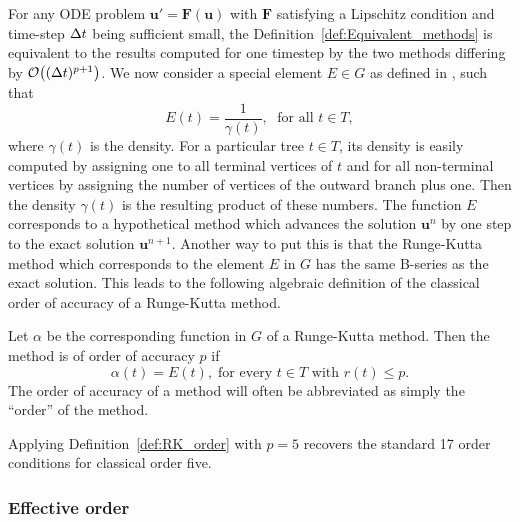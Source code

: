 \indent For any ODE problem $\bm{u}'= \bm{F}(\bm{u})$ with $\bm{F}$ satisfying a Lipschitz condition and time-step $\Delta t$ being sufficient small, the Definition~\ref{def:Equivalent_methods} is equivalent to the results computed for one timestep by the two methods differing by $\mathcal{O}\bigl((\Delta t)^{p+1}\bigr)$.
We now consider a special element $E \in G$ as defined in \cite{Butcher1987_book}, such that
\begin{displaymath}
 	E(t) = \frac{1}{\gamma(t)}, \; \text{ for all } t \in T,
\end{displaymath}
where $\gamma(t)$ is the density. For a particular tree $t \in T$, its density is easily computed by assigning one to all terminal vertices of $t$ and for all non-terminal vertices by assigning the number of vertices of the outward branch plus one. Then the density $\gamma(t)$ is the resulting product of these numbers. The function $E$ corresponds to a hypothetical method which advances the solution $\bm{u}^n$ by one step to the exact solution $\bm{u}^{n+1}$.  Another way to put this is that the Runge-Kutta method which corresponds to the element $E$ in $G$ has the same B-series as the exact solution. This leads to the following algebraic definition of the classical order of accuracy of a Runge-Kutta method.
\begin{definition}\label{def:RK_order}
	Let $\alpha$ be the corresponding function in $G$ of a Runge-Kutta method. Then the method is of order of accuracy $p$ if
	\begin{displaymath}
		\alpha(t) = E(t), \; \text{for every } t \in T \text{ with } r(t) \leq p.
	\end{displaymath}
	The order of accuracy of a method will often be abbreviated as simply the ``order'' of the method.
\end{definition}
\begin{example}\label{ex:Order_conditions}
	Applying Definition~\ref{def:RK_order} with $p=5$ recovers the standard 17 order conditions for classical order five.
\end{example}

\subsubsection{Effective order}\label{sec:Effective_order}


